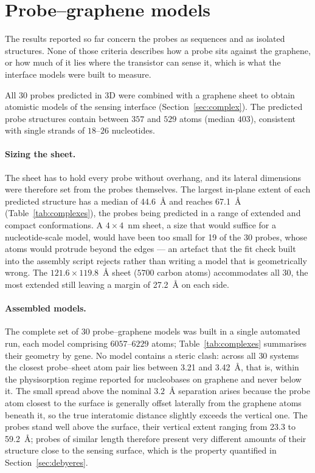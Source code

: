 \section{Probe--graphene models}
\label{sec:complexres}

The results reported so far concern the probes as sequences and as isolated structures. None of
those criteria describes how a probe sits against the graphene, or how much of it lies where the
transistor can sense it, which is what the interface models were built to measure.

All $30$ probes predicted in 3D were combined with a graphene sheet to obtain atomistic models of
the sensing interface (Section~\ref{sec:complex}). The predicted probe structures contain between
$357$ and $529$ atoms (median $403$), consistent with single strands of $18$--$26$ nucleotides.

\paragraph{Sizing the sheet.} The sheet has to hold every probe without overhang, and its lateral
dimensions were therefore set from the probes themselves. The largest in-plane extent of each
predicted structure has a median of 44.6~\AA{} and reaches 67.1~\AA{}
(Table~\ref{tab:complexes}), the probes being predicted in a range of extended and compact
conformations. A $4 \times 4$~nm sheet, a size that would suffice for a nucleotide-scale model,
would have been too small for 19 of the $30$ probes, whose atoms would
protrude beyond the edges --- an artefact that the fit check built into the assembly script rejects
rather than writing a model that is geometrically wrong. The $121.6 \times 119.8$~\AA{} sheet
($5700$ carbon atoms) accommodates all $30$, the most extended still leaving a margin of
27.2~\AA{} on each side.

\paragraph{Assembled models.} The complete set of $30$ probe--graphene models was built in a single
automated run, each model comprising $6057$--$6229$ atoms; Table~\ref{tab:complexes} summarises their
geometry by gene. No model contains a steric clash: across all $30$ systems the closest probe--sheet
atom pair lies between 3.21 and 3.42~\AA{}, that is,
within the physisorption regime reported for nucleobases on graphene \citep{tayo2023} and never
below it. The small spread above the nominal $3.2$~\AA{} separation arises because the probe atom
closest to the surface is generally offset laterally from the graphene atoms beneath it, so the true
interatomic distance slightly exceeds the vertical one. The probes stand well above the surface,
their vertical extent ranging from 23.3 to 59.2~\AA{}; probes of
similar length therefore present very different amounts of their structure close to the sensing
surface, which is the property quantified in Section~\ref{sec:debyeres}.

